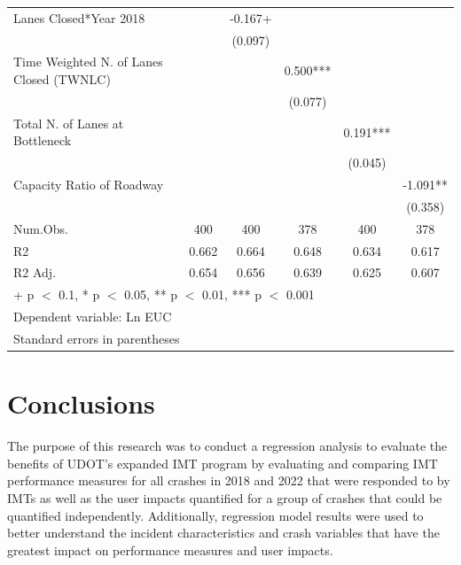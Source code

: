 \documentclass[
  letterpaper,
  authoryear]{elsarticle}
\begin{document}
\begin{table}
{\begin{tabular}[t]{lccccc}
Lanes Closed*Year 2018 &  & -0.167+ &  &  & \\
 &  & (0.097) &  &  & \\
Time Weighted N. of Lanes Closed (TWNLC) &  &  & 0.500*** &  & \\
 &  &  & (0.077) &  & \\
Total N. of Lanes at Bottleneck &  &  &  & 0.191*** & \\
 &  &  &  & (0.045) & \\
Capacity Ratio of Roadway &  &  &  &  & -1.091**\\
 &  &  &  &  & (0.358)\\
\midrule
Num.Obs. & 400 & 400 & 378 & 400 & 378\\
R2 & 0.662 & 0.664 & 0.648 & 0.634 & 0.617\\
R2 Adj. & 0.654 & 0.656 & 0.639 & 0.625 & 0.607\\
\bottomrule
\multicolumn{6}{l}{\rule{0pt}{1em}+ p $<$ 0.1, * p $<$ 0.05, ** p $<$ 0.01, *** p $<$ 0.001}\\
\multicolumn{6}{l}{\rule{0pt}{1em}Dependent variable: Ln EUC}\\
\multicolumn{6}{l}{\rule{0pt}{1em}Standard errors in parentheses}\\
\end{tabular}

}

\end{table}%


\section{Conclusions}\label{conclusions}

The purpose of this research was to conduct a regression analysis to
evaluate the benefits of UDOT's expanded IMT program by evaluating and
comparing IMT performance measures for all crashes in 2018 and 2022 that
were responded to by IMTs as well as the user impacts quantified for a
group of crashes that could be quantified independently. Additionally,
regression model results were used to better understand the incident
characteristics and crash variables that have the greatest impact on
performance measures and user impacts.
\end{document}
